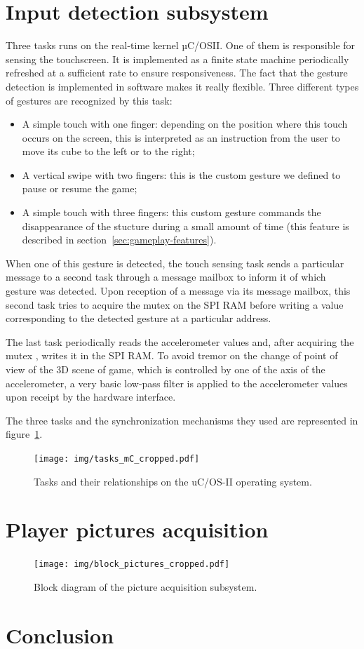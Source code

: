 \documentclass[english, DIV=13]{scrartcl}
\begin{document}
\section{Input detection subsystem}
\label{sec:input-det}

Three tasks runs on the real-time kernel µC/OSII. One of them is responsible
for sensing the touchscreen. It is implemented as a finite state machine periodically
refreshed at a sufficient rate to ensure responsiveness. The fact that the gesture
detection is implemented in software makes it really flexible. Three different types of
gestures are recognized by this task:
\begin{itemize}
    \item A simple touch with one finger: depending on the position where this touch
    occurs on the screen, this is interpreted as an instruction from the user to move
    its cube to the left or to the right;
    \item A vertical swipe with two fingers: this is the custom gesture we defined to
    pause or resume the game;
    \item A simple touch with three fingers: this custom gesture commands the
    disappearance of the stucture during a small amount of time (this feature is
    described in section~\ref{sec:gameplay-features}).
\end{itemize}
When one of this gesture is detected, the touch sensing task sends a particular
message to a second task through a message mailbox to inform it of which gesture
was detected. Upon reception of a message via its message mailbox, this second task
tries to acquire the mutex on the SPI RAM before writing a value corresponding
to the detected gesture at a particular address.

The last task periodically reads the accelerometer values and, after acquiring the mutex
, writes it in the SPI RAM. To avoid tremor on the change of point of
view of the 3D scene of game, which is controlled by one of the axis of the
accelerometer, a very basic low-pass filter is applied to the accelerometer values upon
receipt by the hardware interface.

The three tasks and the synchronization mechanisms they used are represented in
figure~\ref{fig:tasks-mc}.

\begin{figure}
    \centering
    \texttt{[image: img/tasks\_mC\_cropped.pdf]}
    \caption{Tasks and their relationships on the uC/OS-II operating system.}
    \label{fig:tasks-mc}
\end{figure}

\section{Player pictures acquisition}
\label{sec:pic-acq}

\begin{figure}
    \centering
    \texttt{[image: img/block\_pictures\_cropped.pdf]}
    \caption{Block diagram of the picture acquisition subsystem.}
\end{figure}

\section{Conclusion}
\end{document}

